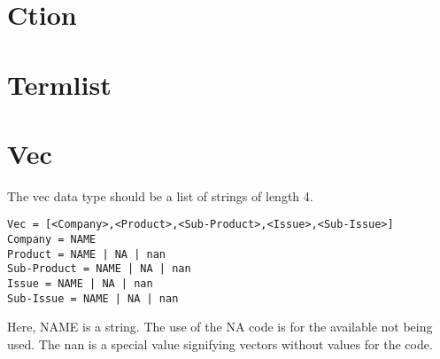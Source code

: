 \documentclass{article}
\begin{document}
\section{Ction}

\section{Termlist}


\section{Vec}
The vec data type should be a list of strings of length 4. 

\begin{lstlisting}
Vec = [<Company>,<Product>,<Sub-Product>,<Issue>,<Sub-Issue>]
Company = NAME
Product = NAME | NA | nan
Sub-Product = NAME | NA | nan
Issue = NAME | NA | nan
Sub-Issue = NAME | NA | nan
\end{lstlisting}

Here, NAME is a string. The use of the NA code is for the available not being used. The nan is a special value signifying vectors without values for the code.
\end{document}
